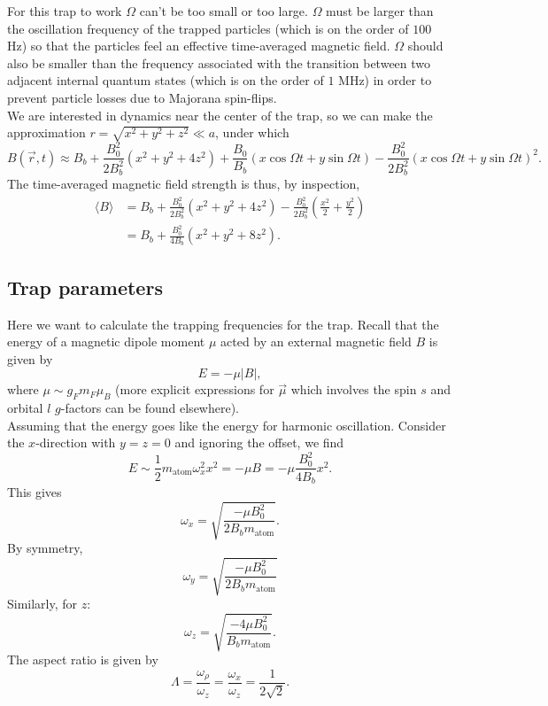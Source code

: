 \documentclass{article}
\theoremstyle{definition}
\newcommand{\f}[2]{\frac{#1}{#2}}
\newcommand{\lp}{\left(}
\newcommand{\rp}{\right)}
\begin{document}
For this trap to work $\Omega$ can't be too small or too large. $\Omega$ must be larger than the oscillation frequency of the trapped particles (which is on the order of $100$ Hz) so that the particles feel an effective time-averaged magnetic field. $\Omega$ should also be smaller than the frequency associated with the transition between two adjacent internal quantum states (which is on the order of $1$ MHz) in order to prevent particle losses due to Majorana spin-flips. \\


We are interested in dynamics near the center of the trap, so we can make the approximation $r = \sqrt{x^2 + y^2 + z^2} \ll a$, under which 
\begin{equation*}
B(\vec{r},t)\approx B_b + \f{B_0^2}{2B_b^2} (x^2 + y^2 + 4z^2) + \f{B_0}{B_b}(x\cos\Omega t+ y\sin\Omega t) - \f{B_0^2}{2B_b^2}(x\cos\Omega t + y\sin\Omega t)^2.
\end{equation*}
The time-averaged magnetic field strength is thus, by inspection,
\begin{align*}
\langle B \rangle 
&= B_b  + \f{B_0^2}{2B_b^2} (x^2 + y^2 + 4z^2) - \f{B_0^2}{2B_b^2}\lp \f{x^2}{2} + \f{y^2}{2}\rp\\ &= B_b + \f{B_0^2}{4B_b}(x^2 + y^2 + 8z^2).
\end{align*}


\subsection{Trap parameters}
Here we want to calculate the trapping frequencies for the trap. Recall that the energy of a magnetic dipole moment $\mu$ acted by an external magnetic field $B$ is given by 
\begin{equation*}
E = -\mu |B|,
\end{equation*}
where $\mu \sim g_F m_F \mu_B$ (more explicit expressions for $\vec{\mu}$ which involves the spin $s$ and orbital $l$ $g$-factors can be found elsewhere).\\ 

Assuming that the energy goes like the energy for harmonic oscillation. Consider the $x$-direction with $y=z=0$ and ignoring the offset, we find
\begin{equation*}
E \sim \f{1}{2}m_\text{atom} \omega_x^2 x^2 = -\mu B = -\mu \f{B_0^2}{4B_b}x^2.
\end{equation*}
This gives
\begin{equation*}
\omega_x = \sqrt{\f{-\mu B_0^2}{2B_b m_\text{atom}}}.
\end{equation*}
By symmetry,
\begin{equation*}
\omega_y = \sqrt{\f{-\mu B_0^2}{2B_b m_\text{atom}}}
\end{equation*}
Similarly, for $z$:
\begin{equation*}
\omega_z = \sqrt{\f{-4\mu B_0^2}{B_b m_\text{atom}}}.
\end{equation*}
The aspect ratio is given by 
\begin{equation*}
\Lambda = \f{\omega_\rho}{\omega_z} = \f{\omega_x}{\omega_z} = {\f{1}{2\sqrt{2}}}.
\end{equation*}
\end{document}
